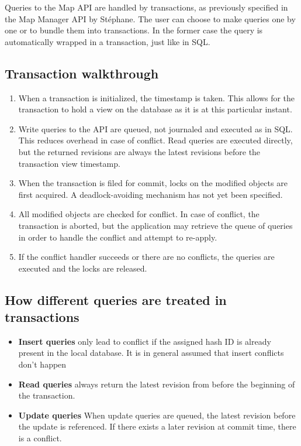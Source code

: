 \documentclass{article}
\begin{document}
Queries to the Map API are handled by transactions, as previously specified in
the Map Manager API by Stéphane. The user can choose to make queries one by one
or to bundle them into transactions. In the former case the query is
automatically wrapped in a transaction, just like in SQL.

\subsection{Transaction walkthrough}

\begin{enumerate} \itemsep0em
  \item When a transaction is initialized, the timestamp is taken. This allows
    for the transaction to hold a view on the database as it is at this
    particular instant.
  \item Write queries to the API are queued, not journaled and executed as in 
    SQL. This reduces overhead in case of conflict. Read queries are executed
    directly, but the returned revisions are always the latest revisions before
    the transaction view timestamp.
  \item When the transaction is filed for commit, locks on the modified objects
    are first acquired. A deadlock-avoiding mechanism has not yet been
    specified.
  \item All modified objects are checked for conflict. In case of conflict,
    the transaction is aborted, but the application may retrieve the queue of
    queries in order to handle the conflict and attempt to re-apply.
  \item If the conflict handler succeeds or there are no conflicts, the 
    queries are executed and the locks are released.
\end{enumerate}

\subsection{How different queries are treated in transactions}

\begin{itemize} \itemsep0em
  \item {\bf Insert queries} only lead to conflict if the assigned hash ID is
    already present in the local database. It is in general assumed that insert
    conflicts don't happen 
  \item {\bf Read queries} always return the latest revision from before the
    beginning of the transaction. 
  \item {\bf Update queries} When update queries are queued, the latest
    revision before the update is referenced. If there exists a later revision 
    at commit time, there is a conflict.
\end{itemize}
\end{document}
